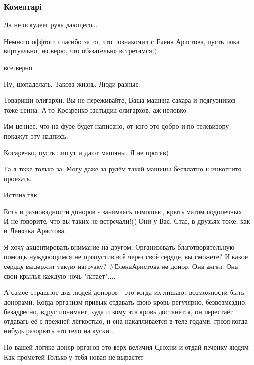  
 
 
 
 
\subsubsection{Коментарі}

\begin{itemize} %
Да не оскудеет рука дающего...

Немного оффтоп: спасибо за то, что познакомил с Елена Аристова, пусть пока виртуально, но верю, что обязательно встретимся;)

все верно

Ну, шопаделать. Такова жизнь. Люди разные.

Товарищи олигархи.
Вы не переживайте, Ваша машина сахара и подгузников тоже ценна.
А то Косаренко застыдил олигархов, аж неловко.

\begin{itemize} %
Им ценнее, что на фуре будет написано, от кого это добро и по телевизору покажут эту надпись.

Косаренко, пусть пишут и дают машины. Я не против)

Та я тоже только за. Могу даже за рулём такой машины бесплатно и инкогнито проехать.
\end{itemize} %

Истина так


Есть и разновидности доноров - занимаясь помощью, крыть матом подопечных. И не
говорите, что вы таких не встречали!(( Они у Вас, Стас, в друзьях тоже, как и
Леночка Аристова.

Я хочу акцентировать внимание на другом. Организовать благотворительную помощь
нуждающимся не пропустив всё через своё сердце, вы сможете? И какое сердце
выдержит такую нагрузку? \#ЕленаАристова не донор. Она ангел. Она свои крылья
каждую ночь "латает"....


А самое страшное для людей-доноров - это когда их лишают возможности быть
донорами. Когда организм привык отдавать свою кровь регулярно, безвозмездно,
безадресно, вдруг понимает, куда и кому эта кровь достанется, он перестаёт
отдавать её с прежней лёгкостью, и она накапливается в теле годами, грозя
когда-нибудь разорвать это тело на куски...


По вашей логике донор органов это верх величия
Сдохни и отдай печенку людям
Как прометей
Только у тебя новая не вырастет

\end{itemize} %
